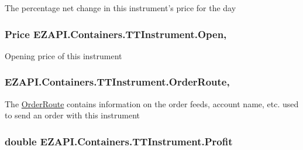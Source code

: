 The percentage net change in this instrument's price for the day 

\hypertarget{class_e_z_a_p_i_1_1_containers_1_1_t_t_instrument_ad7db4bf541289c795ed505fdc42b9f94}{
\subsubsection[{Open}]{\setlength{\rightskip}{0pt plus 5cm}Price E\-Z\-A\-P\-I.\-Containers.\-T\-T\-Instrument.\-Open\hspace{0.3cm}{\ttfamily [get]}, {\ttfamily [set]}}}\label{class_e_z_a_p_i_1_1_containers_1_1_t_t_instrument_ad7db4bf541289c795ed505fdc42b9f94}


Opening price of this instrument 

\hypertarget{class_e_z_a_p_i_1_1_containers_1_1_t_t_instrument_a1df90885829b0b46f20b5511b53596d8}{
\subsubsection[{Order\-Route}]{ E\-Z\-A\-P\-I.\-Containers.\-T\-T\-Instrument.\-Order\-Route\hspace{0.3cm}{\ttfamily [get]}, {\ttfamily [set]}}}\label{class_e_z_a_p_i_1_1_containers_1_1_t_t_instrument_a1df90885829b0b46f20b5511b53596d8}


The \hyperlink{class_e_z_a_p_i_1_1_containers_1_1_order_route}{Order\-Route} contains information on the order feeds, account name, etc. used to send an order with this instrument 

\hypertarget{class_e_z_a_p_i_1_1_containers_1_1_t_t_instrument_a2a905bc8d6ead9617491c49c1c86aa10}{
\subsubsection[{Profit}]{\setlength{\rightskip}{0pt plus 5cm}double E\-Z\-A\-P\-I.\-Containers.\-T\-T\-Instrument.\-Profit\hspace{0.3cm}{\ttfamily [get]}}}\label{class_e_z_a_p_i_1_1_containers_1_1_t_t_instrument_a2a905bc8d6ead9617491c49c1c86aa10}


